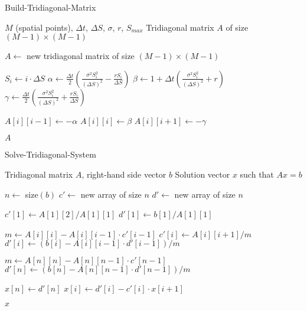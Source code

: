 \documentclass[12pt,a4paper]{article}
\numberwithin{algorithm}{subsection}
\begin{document}
\begin{algorithm}[H]
\caption{Build-Tridiagonal-Matrix}
\begin{algorithmic}[1]
\REQUIRE $M$ (spatial points), $\Delta t$, $\Delta S$, $\sigma$, $r$, $S_{max}$
\ENSURE Tridiagonal matrix $A$ of size $(M-1) \times (M-1)$

\STATE $A \leftarrow$ new tridiagonal matrix of size $(M-1) \times (M-1)$

    \STATE $S_i \leftarrow i \cdot \Delta S$
    \STATE $\alpha \leftarrow \frac{\Delta t}{2} \left( \frac{\sigma^2 S_i^2}{(\Delta S)^2} - \frac{rS_i}{\Delta S} \right)$
    \STATE $\beta \leftarrow 1 + \Delta t \left( \frac{\sigma^2 S_i^2}{(\Delta S)^2} + r \right)$
    \STATE $\gamma \leftarrow \frac{\Delta t}{2} \left( \frac{\sigma^2 S_i^2}{(\Delta S)^2} + \frac{rS_i}{\Delta S} \right)$
    
        \STATE $A[i][i-1] \leftarrow -\alpha$ 
    \ENDIF
    \STATE $A[i][i] \leftarrow \beta$ 
        \STATE $A[i][i+1] \leftarrow -\gamma$ 
    \ENDIF
\ENDFOR

\RETURN $A$
\end{algorithmic}
\end{algorithm}

\begin{algorithm}[H]
\caption{Solve-Tridiagonal-System}
\begin{algorithmic}[1]
\REQUIRE Tridiagonal matrix $A$, right-hand side vector $b$
\ENSURE Solution vector $x$ such that $Ax = b$

\STATE $n \leftarrow$ size$(b)$
\STATE $c' \leftarrow$ new array of size $n$
\STATE $d' \leftarrow$ new array of size $n$

\STATE $c'[1] \leftarrow A[1][2] / A[1][1]$
\STATE $d'[1] \leftarrow b[1] / A[1][1]$

    \STATE $m \leftarrow A[i][i] - A[i][i-1] \cdot c'[i-1]$
    \STATE $c'[i] \leftarrow A[i][i+1] / m$
    \STATE $d'[i] \leftarrow (b[i] - A[i][i-1] \cdot d'[i-1]) / m$
\ENDFOR

\STATE $m \leftarrow A[n][n] - A[n][n-1] \cdot c'[n-1]$
\STATE $d'[n] \leftarrow (b[n] - A[n][n-1] \cdot d'[n-1]) / m$

\STATE $x[n] \leftarrow d'[n]$
    \STATE $x[i] \leftarrow d'[i] - c'[i] \cdot x[i+1]$
\ENDFOR

\RETURN $x$
\end{algorithmic}
\end{algorithm}
\end{document}
